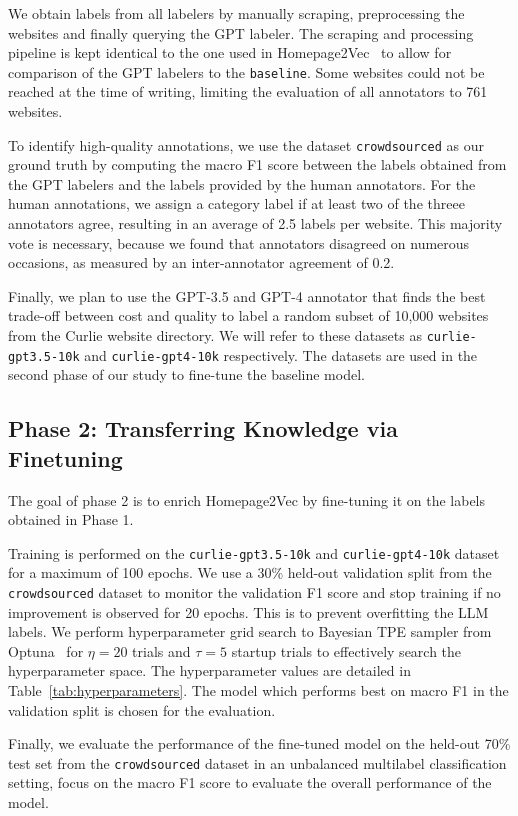 We obtain labels from all labelers by manually scraping, preprocessing the websites and finally querying the GPT labeler. The scraping and processing pipeline is kept identical to the one used in Homepage2Vec~\cite{homepage2vec} to allow for comparison of the GPT labelers to the \texttt{baseline}. Some websites could not be reached at the time of writing, limiting the evaluation of all annotators to 761 websites.

To identify high-quality annotations, we use the dataset \texttt{crowdsourced} as our ground truth by computing the macro F1 score between the labels obtained from the GPT labelers and the labels provided by the human annotators. For the human annotations, we assign a category label if at least two of the threee annotators agree, resulting in an average of 2.5 labels per website. This majority vote is necessary, because we found that annotators disagreed on numerous occasions, as measured by an inter-annotator agreement of 0.2.

Finally, we plan to use the GPT-3.5 and GPT-4 annotator that finds the best trade-off between cost and quality to label a random subset of 10,000 websites from the Curlie website directory. We will refer to these datasets as \texttt{curlie-gpt3.5-10k} and \texttt{curlie-gpt4-10k} respectively. The datasets are used in the second phase of our study to fine-tune the baseline model.

\subsection*{Phase 2: Transferring Knowledge via Finetuning}

The goal of phase 2 is to enrich Homepage2Vec by fine-tuning it on the labels obtained in Phase 1.

Training is performed on the \texttt{curlie-gpt3.5-10k} and \texttt{curlie-gpt4-10k} dataset for a maximum of 100 epochs. We use a 30\% held-out validation split from the \texttt{crowdsourced} dataset to monitor the validation F1 score and stop training if no improvement is observed for 20 epochs. This is to prevent overfitting the LLM labels. We perform hyperparameter grid search to Bayesian TPE sampler from Optuna~\cite{optuna} for $\eta=20$ trials and $\tau=5$ startup trials to effectively search the hyperparameter space. The hyperparameter values are detailed in Table~\ref{tab:hyperparameters}. The model which performs best on macro F1 in the validation split is chosen for the evaluation.



Finally, we evaluate the performance of the fine-tuned model on the held-out 70\% test set from the \texttt{crowdsourced} dataset in an unbalanced multilabel classification setting, focus on the macro F1 score to evaluate the overall performance of the model.
